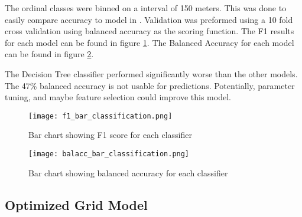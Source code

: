 \par
The ordinal classes were binned on a interval of 150 meters.
This was done to easily compare accuracy to model in \cite{jena2012prediction}.
Validation was preformed using a 10 fold cross validation using balanced accuracy as the scoring function.
The F1 results for each model can be found in figure \ref{fig:f1_barplot_classification}.
The Balanced Accuracy for each model can be found in figure \ref{fig:balacc_barplot_classification}.

\par
The Decision Tree classifier performed significantly worse than the other models.
The 47\% balanced accuracy is not usable for predictions.
Potentially, parameter tuning, and maybe feature selection could improve this model.


\begin{figure}[h]
    \centering
    \texttt{[image: f1\_bar\_classification.png]}
    \caption{Bar chart showing F1 score for each classifier}
    \label{fig:f1_barplot_classification}
\end{figure}

\begin{figure}[h]
    \centering
    \texttt{[image: balacc\_bar\_classification.png]}
    \caption{Bar chart showing balanced accuracy for each classifier}
    \label{fig:balacc_barplot_classification}
\end{figure}

\subsection{Optimized Grid Model}
\setlength{\parindent}{10ex}

